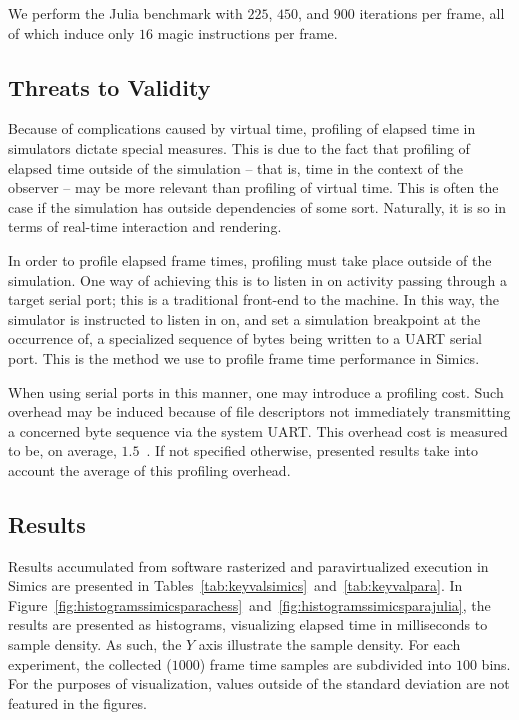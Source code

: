 We perform the Julia benchmark with $225$, $450$, and $900$ iterations per frame, all of which induce only $16$ magic instructions per frame.

\subsection{Threats to Validity}
\label{sec:threatstovalidity}
Because of complications caused by virtual time, profiling of elapsed time in simulators dictate special measures.
This is due to the fact that profiling of elapsed time outside of the simulation -- that is, time in the context of the observer -- may be more relevant than profiling of virtual time.
This is often the case if the simulation has outside dependencies of some sort.
Naturally, it is so in terms of real-time interaction and rendering.

In order to profile elapsed frame times, profiling must take place outside of the simulation.
One way of achieving this is to listen in on activity passing through a target serial port; this is a traditional front-end to the machine.
In this way, the simulator is instructed to listen in on, and set a simulation breakpoint at the occurrence of, a specialized sequence of bytes being written to a UART serial port.
This is the method we use to profile frame time performance in Simics.

When using serial ports in this manner, one may introduce a profiling cost.
Such overhead may be induced because of file descriptors not immediately transmitting a concerned byte sequence via the system UART.
This overhead cost is measured to be, on average, $1.5$~\milli\second .
If not specified otherwise, presented results take into account the average of this profiling overhead.

\subsection{Results}
\label{sec:results}
Results accumulated from software rasterized and paravirtualized execution in Simics are presented in Tables~\ref{tab:keyvalsimics}~and~\ref{tab:keyvalpara}.
In Figure~\ref{fig:histogramssimicsparachess}~and~\ref{fig:histogramssimicsparajulia}, the results are presented as histograms, visualizing elapsed time in milliseconds to sample density.
As such, the $Y$ axis illustrate the sample density.
For each experiment, the collected ($1000$) frame time samples are subdivided into $100$ bins.
For the purposes of visualization, values outside of the standard deviation are not featured in the figures.

